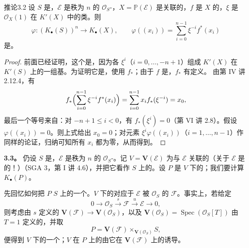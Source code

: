 \begin{SGAresult}{推论}{3.2}
设 $S$ 是，$\mathcal E$ 是秩为 $n$ 的 $\mathcal O_S$-，$X=\mathbb P(\mathcal E)$ 是关联的，$f$ 是 $X$ 的，$\xi$ 是 $\mathcal O_X(1)$ 在 $K'(X)$ 中的类。则
\[
\varphi:(K_\bullet(S))^n\longrightarrow K_\bullet(X),\qquad
\varphi((x_i))=\sum_{i=0}^{n-1}\xi^{-i}f^*(x_i)
\]
是。
\end{SGAresult}
\begin{proof}
前面已经证明，这个是，因为各 $\xi^i$（$i=0,\ldots,-n+1$）组成 $K'(X)$ 在 $K'(S)$ 上的一组基。为证明它是，使用 $f_*$；由于 $f$ 是，$f_*$ 有定义。
由第 IV 讲 2.12.4，有
\[
f_*\Bigl(\sum_{i=0}^{n-1}\xi^{-i}f^*(x_i)\Bigr)
=\sum_{i=0}^{n-1}x_i f_*(\xi^{-i})=x_0,
\]
最后一个等号来自：对 $-n+1\leq i<0$，有 $f_*(\xi^i)=0$（第 VI 讲 2.8）。假设 $\varphi((x_i))=0$。则上式给出 $x_0=0$；对元素 $\xi^i\varphi((x_i))$（$i=1,\ldots,n-1$）作同样的论证，归纳可知所有 $x_i$ 都为零，从而得到。
\end{proof}

\textbf{3.3。} 仍设 $S$ 是，$\mathcal E$ 是秩为 $n$ 的 $\mathcal O_S$-。记 $V=\mathbf V(\mathcal E)$ 为与 $\mathcal E$ 关联的（关于 $\mathcal E$ 是的！）（SGA 3，第 I 讲 4.6），并把它看作 $S$ 上的。设 $P$ 是 $V$ 下的；我们要计算 $K_\bullet(P)$。

先回忆如何把 $P$  $S$ 上的一个。$V$ 下的对应于 $\mathcal E$ 被 $\mathcal O_S$ 的 $\mathcal F$。事实上，若给定
\begin{equation}
0\longrightarrow\mathcal O_S\xrightarrow{s}\mathcal F\xrightarrow{u}\mathcal E\longrightarrow0,
\tag{3.3.1}
\end{equation}
则考虑由 $s$ 定义的 $\mathbf V(\mathcal F)\to\mathbf V(\mathcal O_S)$，以及 $\mathbf V(\mathcal O_S)=\operatorname{Spec}(\mathcal O_S[T])$ 由 $T=1$ 定义的，并取
\[
P=\mathbf V(\mathcal F)\times_{\mathbf V(\mathcal O_S)}S,
\]
便得到 $V$ 下的一个；$V$ 在 $P$ 上的由它在 $\mathbf V(\mathcal F)$ 上的诱导。

